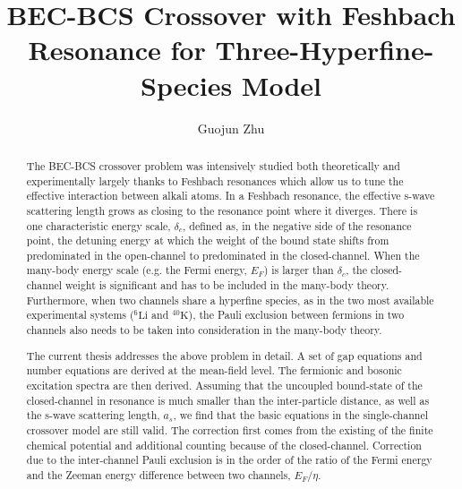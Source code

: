 \documentclass[edeposit,fullpage,prequest,10pt]{uiucthesis2009}
\begin{document}
\title{BEC-BCS Crossover with Feshbach Resonance for Three-Hyperfine-Species Model}
\author{Guojun Zhu}
\phdthesis
{}
\maketitle

\frontmatter

%
\begin{abstract}
The BEC-BCS crossover problem was intensively studied both theoretically and experimentally largely thanks to  Feshbach resonances which allow us to tune the effective interaction between alkali atoms.  In a Feshbach resonance, the effective s-wave scattering length grows as closing to the resonance point where it diverges.  There is one characteristic energy scale, $\delta_c$, defined as, in the negative side of the resonance point, the detuning energy at which the weight of the bound state shifts from predominated in the open-channel to predominated in the closed-channel.  When the many-body energy scale (e.g. the Fermi energy, $E_{F}$) is larger than $\delta_c$, the closed-channel weight is significant and has to be included in the many-body theory.  Furthermore, when two channels share a hyperfine species, as in the two most available experimental systems (${}^6\text{Li}$ and ${}^{40}\text{K}$), the Pauli exclusion between fermions in two channels also needs to be taken into consideration in the many-body theory.  

The current  thesis addresses the above problem in detail. A set of gap equations and number equations  are derived at the mean-field level.  The fermionic and bosonic excitation spectra are then derived. Assuming that the uncoupled bound-state of the closed-channel in resonance is much smaller than the inter-particle distance, as well as the s-wave scattering length, $a_s$, we find that  the basic equations in the single-channel crossover model are still valid. The correction first comes from the existing of the finite chemical potential and additional counting because of the closed-channel.  Correction due to the inter-channel Pauli exclusion is   in the  order of the ratio of the Fermi energy and the Zeeman energy difference between two channels, $E_F/\eta$.  
\end{abstract}
\end{document}
